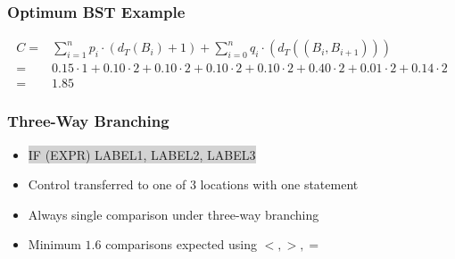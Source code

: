 \documentclass{beamer}
\theoremstyle{plain}
\begin{document}
\begin{frame} \frametitle{Optimum BST Example}
\begin{center}



{\scriptsize
\begin{align*}
C = &\sum_{i=1}^{n} p_i \cdot (d_T(B_i)+1) + \sum_{i=0}^{n} q_i \cdot(d_T((B_i, B_{i+1}))) \\
= &0.15 \cdot 1 + 0.10 \cdot 2 + 0.10 \cdot 2 + 0.10 \cdot 2 + 0.10 \cdot 2 + 0.40 \cdot 2 + 0.01 \cdot 2 + 0.14 \cdot 2 \\
= &1.85
\end{align*}
}%

\end{center}
\end{frame}

\begin{frame} \frametitle{Three-Way Branching}

\begin{center}
\end{center}

\begin{itemize}



\item {} %
\colorbox{lightgrey}{ \selectfont \uppercase{IF (expr) label1, label2, label3} } 

\item Control transferred to one of $3$ locations with one statement

\item Always single comparison under three-way branching

\item Minimum $1.6$ comparisons expected using $<, >, =$
\end{itemize}
\end{frame}
\end{document}
